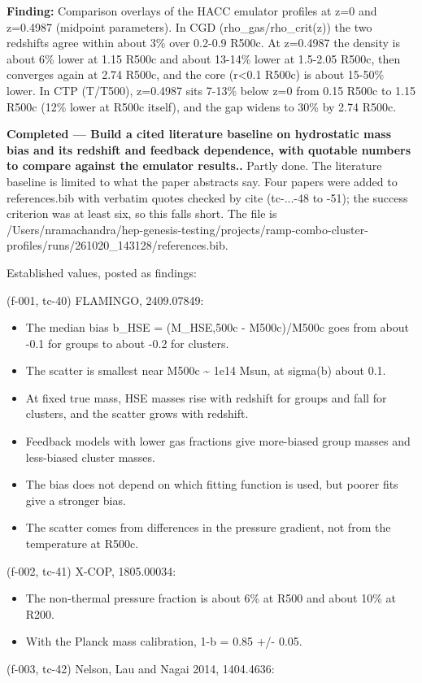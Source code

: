 \documentclass[11pt,a4paper]{article}
\begin{document}
\textbf{Finding:} Comparison overlays of the HACC emulator profiles at z=0 and z=0.4987 (midpoint parameters). In CGD (rho\_gas/rho\_crit(z)) the two redshifts agree within about 3\% over 0.2-0.9 R500c. At z=0.4987 the density is about 6\% lower at 1.15 R500c and about 13-14\% lower at 1.5-2.05 R500c, then converges again at 2.74 R500c, and the core (r\textless{}0.1 R500c) is about 15-50\% lower. In CTP (T/T500), z=0.4987 sits 7-13\% below z=0 from 0.15 R500c to 1.15 R500c (12\% lower at R500c itself), and the gap widens to 30\% by 2.74 R500c.

\textbf{Completed --- Build a cited literature baseline on hydrostatic mass bias and its redshift and feedback dependence, with quotable numbers to compare against the emulator results..} Partly done. The literature baseline is limited to what the paper abstracts say. Four papers were added to references.bib with verbatim quotes checked by cite (tc-...-48 to -51); the success criterion was at least six, so this falls short. The file is /Users/nramachandra/hep-genesis-testing/projects/ramp-combo-cluster-profiles/runs/261020\_143128/references.bib.

Established values, posted as findings:

(f-001, tc-40) FLAMINGO, 2409.07849:

\begin{itemize}
  \item The median bias b\_HSE = (M\_HSE,500c - M500c)/M500c goes from about -0.1 for groups to about -0.2 for clusters.
  \item The scatter is smallest near M500c \textasciitilde{} 1e14 Msun, at sigma(b) about 0.1.
  \item At fixed true mass, HSE masses rise with redshift for groups and fall for clusters, and the scatter grows with redshift.
  \item Feedback models with lower gas fractions give more-biased group masses and less-biased cluster masses.
  \item The bias does not depend on which fitting function is used, but poorer fits give a stronger bias.
  \item The scatter comes from differences in the pressure gradient, not from the temperature at R500c.
\end{itemize}
(f-002, tc-41) X-COP, 1805.00034:

\begin{itemize}
  \item The non-thermal pressure fraction is about 6\% at R500 and about 10\% at R200.
  \item With the Planck mass calibration, 1-b = 0.85 +/- 0.05.
\end{itemize}
(f-003, tc-42) Nelson, Lau and Nagai 2014, 1404.4636:
\end{document}
